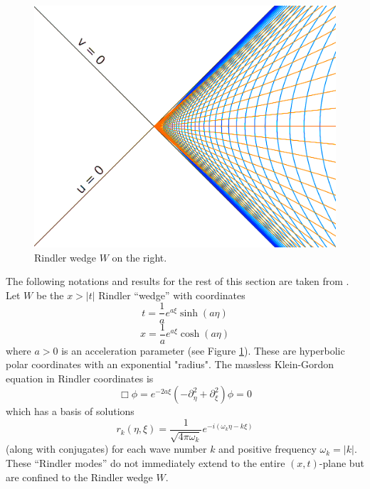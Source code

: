 \documentclass[12pt,a4paper]{article}
\begin{document}
\begin{figure}[h]
\centering
\includegraphics[scale=0.2]{rindler_w.png}
\caption{Rindler wedge $W$ on the right.}
\label{rindlerw}
\end{figure}

The following notations and results for the rest of this section are taken from \cite{Frodden}. Let $W$ be the $x>|t|$ Rindler ``wedge'' with coordinates
\begin{equation}
  t = \frac{1}{a}e^{a\xi}\sinh{(a\eta)}
\label{sinh}
\end{equation}
\begin{equation}
x = \frac{1}{a}e^{a\xi}\cosh{(a\eta)}
\end{equation}
where $a>0$ is an acceleration parameter (see Figure \ref{rindlerw}). These are hyperbolic polar coordinates with an exponential "radius".  The massless Klein-Gordon equation in Rindler coordinates is
\begin{equation}
  \Box \phi = e^{-2a \xi}(-\partial_\eta^2 + \partial_\xi^2) \phi = 0
\end{equation}
which has a basis of solutions 
\begin{equation}
 r_k(\eta,\xi) = \frac{1}{\sqrt{4 \pi \omega_k}} e^{-i(\omega_k \eta -k \xi)}
\end{equation}
(along with conjugates) for each wave number $k$ and positive frequency $\omega_k = |k|$.  These ``Rindler modes'' do not immediately extend to the entire $(x,t)$-plane but are confined to the Rindler wedge $W$. 
\end{document}
